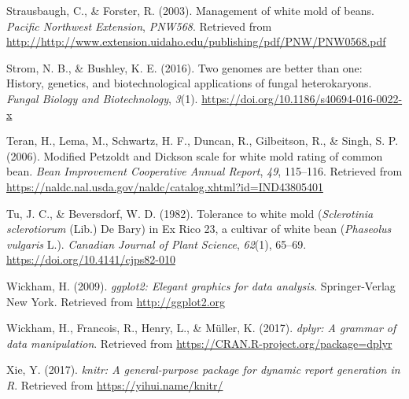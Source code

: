 \hypertarget{ref-strausbaugh2003management}{}
Strausbaugh, C., \& Forster, R. (2003). Management of white mold of
beans. \emph{Pacific Northwest Extension}, \emph{PNW568}. Retrieved from
\url{http://http://www.extension.uidaho.edu/publishing/pdf/PNW/PNW0568.pdf}

\hypertarget{ref-strom2016genomes}{}
Strom, N. B., \& Bushley, K. E. (2016). Two genomes are better than one:
History, genetics, and biotechnological applications of fungal
heterokaryons. \emph{Fungal Biology and Biotechnology}, \emph{3}(1).
\url{https://doi.org/10.1186/s40694-016-0022-x}

\hypertarget{ref-teran2006modified}{}
Teran, H., Lema, M., Schwartz, H. F., Duncan, R., Gilbeitson, R., \&
Singh, S. P. (2006). Modified Petzoldt and Dickson scale for white mold
rating of common bean. \emph{Bean Improvement Cooperative Annual
Report}, \emph{49}, 115--116. Retrieved from
\url{https://naldc.nal.usda.gov/naldc/catalog.xhtml?id=IND43805401}

\hypertarget{ref-tu1982tolerance}{}
Tu, J. C., \& Beversdorf, W. D. (1982). Tolerance to white mold
(\emph{Sclerotinia sclerotiorum} (Lib.) De Bary) in Ex Rico 23, a
cultivar of white bean (\emph{Phaseolus vulgaris} L.). \emph{Canadian
Journal of Plant Science}, \emph{62}(1), 65--69.
\url{https://doi.org/10.4141/cjps82-010}

\hypertarget{ref-ggplot2}{}
Wickham, H. (2009). \emph{ggplot2: Elegant graphics for data analysis}.
Springer-Verlag New York. Retrieved from \url{http://ggplot2.org}

\hypertarget{ref-dplyr}{}
Wickham, H., Francois, R., Henry, L., \& Müller, K. (2017). \emph{dplyr:
A grammar of data manipulation}. Retrieved from
\url{https://CRAN.R-project.org/package=dplyr}

\hypertarget{ref-xie2017knitr}{}
Xie, Y. (2017). \emph{knitr: A general-purpose package for dynamic
report generation in R}. Retrieved from \url{https://yihui.name/knitr/}




